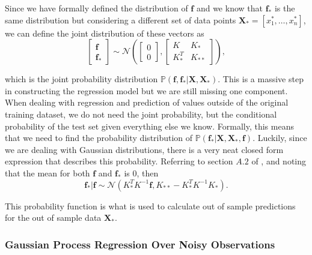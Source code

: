 Since we have formally defined the distribution of $\boldsymbol{f}$ and we know that $\boldsymbol{f}_*$ is the same distribution but considering a different set of data points $\boldsymbol{X}_* = [x^*_1, \ldots, x^*_n]$, we can define the joint distribution of these vectors as 
\begin{equation}
	\label{joint_dist}
	\begin{bmatrix}
		\boldsymbol{f} \\
		\boldsymbol{f}_*
	\end{bmatrix} \sim \mathcal{N}\left( \begin{bmatrix}
		0 \\
		0
	\end{bmatrix} , \begin{bmatrix}
		K & K_* \\
		K_*^T & K_{**}
	\end{bmatrix} \right), 
\end{equation}

which is the joint probability distribution $\mathbb{P}(\boldsymbol{f}, \boldsymbol{f}_* | \boldsymbol{X}, \boldsymbol{X}_*)$. This is a massive step in constructing the regression model but we are still missing one component. When dealing with regression and prediction of values outside of the original training dataset, we do not need the joint probability, but the conditional probability of the test set given everything else we know. Formally, this means that we need to find the probability distribution of $\mathbb{P}(\boldsymbol{f}_* | \boldsymbol{X}, \boldsymbol{X}_*, \boldsymbol{f})$. Luckily, since we are dealing with Gaussian distributions, there is a very neat closed form expression that describes this probability. Referring to section $A.2$ of \cite{rasmussen2006gaussian}, and noting that the mean for both $\boldsymbol{f}$ and $\boldsymbol{f}_*$ is 0, then 
\[ \boldsymbol{f}_* | \boldsymbol{f} \sim \mathcal{N}(K_*^T K^{-1} \boldsymbol{f}, K_{**} - K_*^T K^{-1} K_*). \]

This probability function is what is used to calculate out of sample predictions for the out of sample data $\boldsymbol{X}_*$. 

\subsubsection{Gaussian Process Regression Over Noisy Observations}


